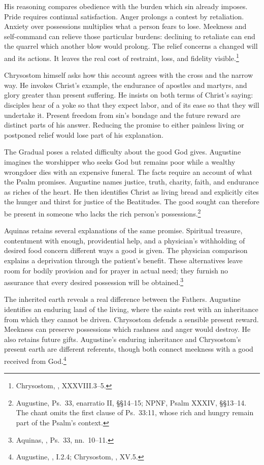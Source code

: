 His reasoning compares obedience with the burden which sin already
imposes. Pride requires continual satisfaction. Anger prolongs
a contest by retaliation. Anxiety over possessions multiplies
what a person fears to lose. Meekness and self-command can relieve
those particular burdens: declining to retaliate can end the
quarrel which another blow would prolong. The relief concerns a
changed will and its actions. It leaves the real cost of restraint,
loss, and fidelity visible.\footnote{Chrysostom,
, XXXVIII.3--5.}

Chrysostom himself asks how this account agrees with the cross
and the narrow way. He invokes Christ's example, the endurance
of apostles and martyrs, and glory greater than present suffering.
He insists on both terms of Christ's saying: disciples hear of
a yoke so that they expect labor, and of its ease so that they
will undertake it. Present freedom from sin's bondage and the
future reward are distinct parts of his answer. Reducing the
promise to either painless living or postponed relief would
lose part of his explanation.

The Gradual poses a related difficulty about the good God gives.
Augustine imagines the worshipper who seeks God but remains poor
while a wealthy wrongdoer dies with an expensive funeral.
The facts require an account of what the Psalm promises.
Augustine names justice, truth, charity, faith, and endurance
as riches of the heart. He then identifies Christ as living
bread and explicitly cites the hunger and thirst for justice
of the Beatitudes. The good sought can therefore be present
in someone who lacks the rich person's possessions.\footnote{Augustine,
Ps.~33, enarratio II, \S\S14--15; NPNF, Psalm XXXIV,
\S\S13--14. The chant omits the first clause of Ps.~33:11,
whose rich and hungry remain part of the Psalm's context.}

Aquinas retains several explanations of the same promise.
Spiritual treasure, contentment with enough, providential help,
and a physician's withholding of desired food concern different
ways a good is given. The physician comparison explains a
deprivation through the patient's benefit. These alternatives
leave room for bodily provision and for prayer in actual need;
they furnish no assurance that every desired possession will
be obtained.\footnote{Aquinas, , Ps.~33,
nn.~10--11.}

The inherited earth reveals a real difference between the Fathers.
Augustine identifies an enduring land of the living, where the
saints rest with an inheritance from which they cannot be driven.
Chrysostom defends a sensible present reward. Meekness can preserve
possessions which rashness and anger would destroy. He also
retains future gifts. Augustine's enduring inheritance and
Chrysostom's present earth are different referents, though both
connect meekness with a good received from God.\footnote{Augustine,
, I.2.4; Chrysostom,
, XV.5.}

